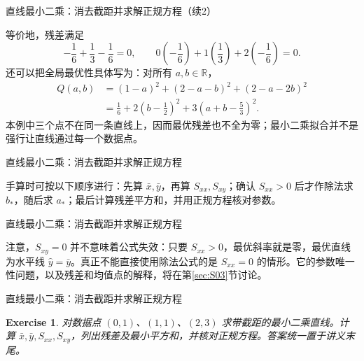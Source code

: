 \documentclass[aspectratio=169,10pt,fontset=fandol]{ctexbeamer}
\newtheorem{exercise}{Exercise}
\begin{document}
\begin{frame}[t,fragile]{直线最小二乘：消去截距并求解正规方程（续2）}
\footnotesize
{\footnotesize
等价地，残差满足
\[
-\frac16+\frac13-\frac16=0,\qquad
0\left(-\frac16\right)+1\left(\frac13\right)+2\left(-\frac16\right)=0.
\]
还可以把全局最优性具体写为：对所有 $a,b\in\mathbb{R}$，
\[
\begin{aligned}
Q(a,b)&=(1-a)^2+(2-a-b)^2+(2-a-2b)^2\\
&=\frac16+2\left(b-\frac12\right)^2+3\left(a+b-\frac53\right)^2.
\end{aligned}
\]
本例中三个点不在同一条直线上，因而最优残差也不全为零；最小二乘拟合并不是强行让直线通过每一个数据点。\par

}
\end{frame}
\begin{frame}[t,fragile]{直线最小二乘：消去截距并求解正规方程}
\footnotesize
{\footnotesize
手算时可按以下顺序进行：先算 $\bar{x},\bar{y}$，再算 $S_{xx},S_{xy}$；确认 $S_{xx}>0$ 后才作除法求 $b_*$，随后求 $a_*$；最后计算残差平方和，并用正规方程核对参数。


}
\end{frame}
\begin{frame}[t,fragile]{直线最小二乘：消去截距并求解正规方程}
\footnotesize
{\footnotesize
注意，$S_{xy}=0$ 并不意味着公式失效：只要 $S_{xx}>0$，最优斜率就是零，最优直线为水平线 $\hat{y}=\bar{y}$。真正不能直接使用除法公式的是 $S_{xx}=0$ 的情形。它的参数唯一性问题，以及残差和均值点的解释，将在第\ref{sec:S03}节讨论。\par

}
\end{frame}
\begin{frame}[t,fragile]{直线最小二乘：消去截距并求解正规方程}
\normalsize
{\normalsize
\begin{exercise}
\label{mathagent:exercise:332ae2e99c79cf97370ba4732967ff23f2a2c4a4b36b98eda8e910755bf43b8b}
对数据点 $(0,1)$、$(1,1)$、$(2,3)$ 求带截距的最小二乘直线。计算 $\bar{x},\bar{y},S_{xx},S_{xy}$，列出残差及最小平方和，并核对正规方程。答案统一置于讲义末尾。
\end{exercise}
}
\end{frame}
\end{document}
